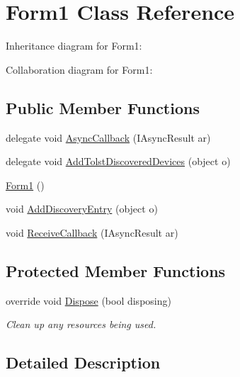 \hypertarget{class_embedded___device___discoverer_1_1_form1}{}\section{Form1 Class Reference}
\label{class_embedded___device___discoverer_1_1_form1}


Inheritance diagram for Form1\+:


Collaboration diagram for Form1\+:
\subsection*{Public Member Functions}
\begin{DoxyCompactItemize}
\item 
delegate void \hyperlink{class_embedded___device___discoverer_1_1_form1_a1f46a0d615362baa79284b6700e5629c}{Async\+Callback} (I\+Async\+Result ar)
\item 
delegate void \hyperlink{class_embedded___device___discoverer_1_1_form1_a48a6f495d24badba6f9f71bcc2c22163}{Add\+Tolst\+Discovered\+Devices} (object o)
\item 
\hyperlink{class_embedded___device___discoverer_1_1_form1_a1e90f54a076166c2729e4fc130785fc6}{Form1} ()
\item 
void \hyperlink{class_embedded___device___discoverer_1_1_form1_a0c08c913ca5d2a66a35d5ff3009e1a80}{Add\+Discovery\+Entry} (object o)
\item 
void \hyperlink{class_embedded___device___discoverer_1_1_form1_a99aa711280ceb6667af8e787519535b6}{Receive\+Callback} (I\+Async\+Result ar)
\end{DoxyCompactItemize}
\subsection*{Protected Member Functions}
\begin{DoxyCompactItemize}
\item 
override void \hyperlink{class_embedded___device___discoverer_1_1_form1_a849c3c7f8d08104f0cdb46bee9fe6389}{Dispose} (bool disposing)
\begin{DoxyCompactList}\small\item\em Clean up any resources being used. \end{DoxyCompactList}\end{DoxyCompactItemize}


\subsection{Detailed Description}



